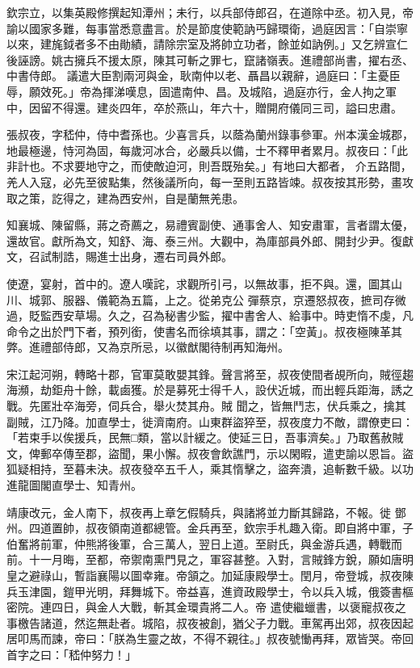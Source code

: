 \begin{pinyinscope}
 欽宗立，以集英殿修撰起知潭州；未行，以兵部侍郎召，在道除中丞。初入見，帝諭以國家多難，每事當悉意盡言。於是節度使範訥丐歸環衛，過庭因言：「自崇寧以來，建旄鉞者多不由勛績，請除宗室及將帥立功者，餘並如訥例。」又乞辨宣仁後誣謗。姚古擁兵不援太原，陳其可斬之罪七，竄諸嶺表。進禮部尚書，擢右丞、中書侍郎。
 議遣大臣割兩河與金，耿南仲以老、聶昌以親辭，過庭曰：「主憂臣辱，願效死。」帝為揮涕嘆息，固遣南仲、昌。及城陷，過庭亦行，金人拘之軍中，因留不得還。建炎四年，卒於燕山，年六十，贈開府儀同三司，謚曰忠肅。



 張叔夜，字嵇仲，侍中耆孫也。少喜言兵，以蔭為蘭州錄事參軍。州本漢金城郡，地最極邊，恃河為固，每歲河冰合，必嚴兵以備，士不釋甲者累月。叔夜曰：「此非計也。不求要地守之，而使敵迫河，則吾既殆矣。」有地曰大都者，
 介五路間，羌人入寇，必先至彼點集，然後議所向，每一至則五路皆竦。叔夜按其形勢，畫攻取之策，訖得之，建為西安州，自是蘭無羌患。



 知襄城、陳留縣，蔣之奇薦之，易禮賓副使、通事舍人、知安肅軍，言者謂太優，還故官。獻所為文，知舒、海、泰三州。大觀中，為庫部員外郎、開封少尹。復獻文，召試制誥，賜進士出身，遷右司員外郎。



 使遼，宴射，首中的。遼人嘆詫，求觀所引弓，以無故事，拒不與。還，圖其山川、城郭、服器、儀範為五篇，上之。從弟克公
 彈蔡京，京遷怒叔夜，摭司存微過，貶監西安草場。久之，召為秘書少監，擢中書舍人、給事中。時吏惰不虔，凡命令之出於門下者，預列銜，使書名而徐填其事，謂之：「空黃」。叔夜極陳革其弊。進禮部侍郎，又為京所忌，以徽猷閣待制再知海州。



 宋江起河朔，轉略十郡，官軍莫敢嬰其鋒。聲言將至，叔夜使間者覘所向，賊徑趨海瀕，劫鉅舟十餘，載鹵獲。於是募死士得千人，設伏近城，而出輕兵距海，誘之戰。先匿壯卒海旁，伺兵合，舉火焚其舟。賊
 聞之，皆無鬥志，伏兵乘之，擒其副賊，江乃降。加直學士，徙濟南府。山東群盜猝至，叔夜度力不敵，謂僚吏曰：「若束手以俟援兵，民無□類，當以計緩之。使延三日，吾事濟矣。」乃取舊赦賊文，俾郵卒傳至郡，盜聞，果小懈。叔夜會飲譙門，示以閑暇，遣吏諭以恩旨。盜狐疑相持，至暮未決。叔夜發卒五千人，乘其惰擊之，盜奔潰，追斬數千級。以功進龍圖閣直學士、知青州。



 靖康改元，金人南下，叔夜再上章乞假騎兵，與諸將並力斷其歸路，不報。徙
 鄧州。四道置帥，叔夜領南道都總管。金兵再至，欽宗手札趣入衛。即自將中軍，子伯奮將前軍，仲熊將後軍，合三萬人，翌日上道。至尉氏，與金游兵遇，轉戰而前。十一月晦，至都，帝禦南熏門見之，軍容甚整。入對，言賊鋒方銳，願如唐明皇之避祿山，暫詣襄陽以圖幸雍。帝頷之。加延康殿學士。閏月，帝登城，叔夜陳兵玉津園，鎧甲光明，拜舞城下。帝益喜，進資政殿學士，令以兵入城，俄簽書樞密院。連四日，與金人大戰，斬其金環貴將二人。帝
 遣使繼蠟書，以褒寵叔夜之事檄告諸道，然迄無赴者。城陷，叔夜被創，猶父子力戰。車駕再出郊，叔夜因起居叩馬而諫，帝曰：「朕為生靈之故，不得不親往。」叔夜號慟再拜，眾皆哭。帝回首字之曰：「嵇仲努力！」




\end{pinyinscope}
